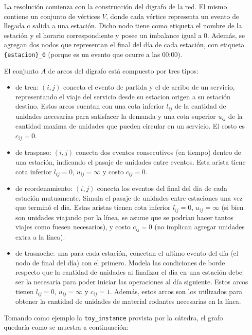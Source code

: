 \documentclass{article}
\begin{document}
La resolución comienza con la construcción del digrafo de la red. El mismo contiene un conjunto de vértices $V$, donde cada vértice representa un evento de llegada o salida a una estación. Dicho nodo tiene como etiqueta el nombre de la estación y el horario correspondiente y posee un imbalance igual a 0. Además, se agregan dos nodos que representan el final del día de cada estación, con etiqueta  \texttt{\{estacion\}\_0} (porque es un evento que ocurre a las 00:00).

El conjunto $A$ de arcos del digrafo está compuesto por tres tipos:

\begin{itemize}
    \item de tren: $(i, j)$ conecta el evento de partida y el de arribo de un servicio, representando el viaje del servicio desde su estacion origen a su estación destino. Estos arcos cuentan con una cota inferior $l_{ij}$ de la cantidad de unidades necesarias para satisfacer la demanda y una cota superior $u_{ij}$ de la cantidad maxima de unidades que pueden circular en un servicio. El costo es $c_{ij} = 0$.
    \item de traspaso: $(i, j)$ conecta dos eventos consecutivos (en tiempo) dentro de una estación, indicando el pasaje de unidades entre eventos. Esta arista tiene cota inferior $l_{ij} = 0$, $u_{ij} = \infty$ y costo $c_{ij} = 0$.
    \item de reordenamiento: $(i, j)$ conecta los eventos del final del dia de cada estación mutuamente. Simula el pasaje de unidades entre estaciones una vez que terminó el día. Estas aristas tienen cota inferior $l_{ij} = 0$, $u_{ij} = \infty$ (si bien son unidades viajando por la línea, se asume que se podrían hacer tantos viajes como fuesen necesarios), y costo $c_{ij} = 0$ (no implican agregar unidades extra a la línea).
    \item de trasnoche: una para cada estación, conectan el ultimo evento del día (el nodo de final del día) con el primero. Modela las condiciones de borde respecto que la cantidad de unidades al finalizar el día en una estación debe ser la necesaria para poder iniciar las operaciones al día siguiente. Estos arcos tienen $l_{ij}= 0$, $u_{ij} = \infty$ y $c_{ij} = 1$. Además, estos arcos son los utilizados para obtener la cantidad de unidades de material rodantes necesarias en la línea.
\end{itemize}

Tomando como ejemplo la \texttt{toy\_instance} provista por la cátedra, el grafo quedaría como se muestra a continuación:
\end{document}
